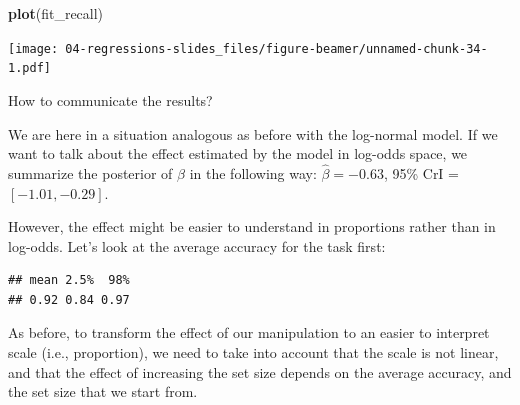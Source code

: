 \documentclass[12pt,ignorenonframetext,aspectratio=169]{beamer}
\newenvironment{Shaded}{\begin{snugshade}}{\end{snugshade}}
\newcommand{\DataTypeTok}[1]{\textcolor[rgb]{0.13,0.29,0.53}{#1}}
\newcommand{\DecValTok}[1]{\textcolor[rgb]{0.00,0.00,0.81}{#1}}
\newcommand{\FloatTok}[1]{\textcolor[rgb]{0.00,0.00,0.81}{#1}}
\newcommand{\KeywordTok}[1]{\textcolor[rgb]{0.13,0.29,0.53}{\textbf{#1}}}
\newcommand{\NormalTok}[1]{#1}
\newcommand{\OperatorTok}[1]{\textcolor[rgb]{0.81,0.36,0.00}{\textbf{#1}}}
\newcommand{\StringTok}[1]{\textcolor[rgb]{0.31,0.60,0.02}{#1}}
\begin{document}
\begin{frame}[fragile]

\small

\begin{Shaded}
\begin{Highlighting}[]
\KeywordTok{plot}\NormalTok{(fit_recall)}
\end{Highlighting}
\end{Shaded}

\texttt{[image: 04-regressions-slides\_files/figure-beamer/unnamed-chunk-34-1.pdf]}

\normalsize

\end{frame}

\begin{frame}[fragile]{How to communicate the results?}
\protect\hypertarget{how-to-communicate-the-results-3}{}

\small

\normalsize

We are here in a situation analogous as before with the log-normal model. If we want to talk about the effect estimated by the model in log-odds space, we summarize the posterior of \(\beta\) in the following way: \(\hat\beta = -0.63\), 95\% CrI = \([ -1.01 , -0.29 ]\).

However, the effect might be easier to understand in proportions rather than in log-odds. Let's look at the average accuracy for the task first:

\small

\begin{Shaded}
\end{Shaded}

\begin{verbatim}
## mean 2.5%  98% 
## 0.92 0.84 0.97
\end{verbatim}

\normalsize

As before, to transform the effect of our manipulation to an easier to interpret scale (i.e., proportion), we need to take into account that the scale is not linear, and that the effect of increasing the set size depends on the average accuracy, and the set size that we start from.


\end{frame}
\end{document}
